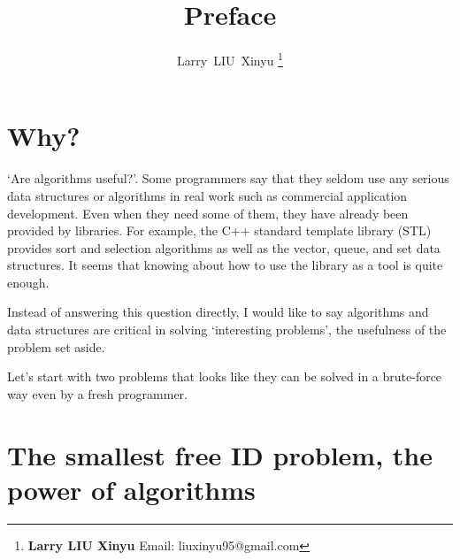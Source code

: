 \documentclass{article}
\begin{document}


\title{Preface}

\author{Larry~LIU~Xinyu
\thanks{{\bfseries Larry LIU Xinyu } \newline
  Email: liuxinyu95@gmail.com \newline}
  }

\maketitle
\fi


\section{Why?}
\label{why}

`Are algorithms useful?'. Some programmers
say that they seldom use any serious data structures or algorithms
in real work such as commercial application development. Even when they need
some of them, they have already been provided by libraries. For example,
the C++ standard template library (STL) provides sort and selection
algorithms as well as the vector, queue, and set data structures.
It seems that knowing about how to use the library as a tool is quite
enough.

Instead of answering this question directly, I would like to
say algorithms and data structures are critical in solving `interesting
problems', the usefulness of the problem set aside.

Let's start with two problems that looks like they can be
solved in a brute-force way even by a fresh programmer.

\section{The smallest free ID problem, the power of algorithms}
\label{min-free} 
\end{document}
